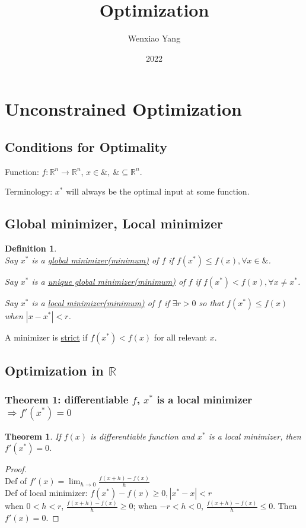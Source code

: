 \documentclass[11pt,a4paper]{article}
\title{Optimization}
\author[*]{Wenxiao Yang}
\affil[*]{Department of Mathematics, University of Illinois at Urbana-Champaign}
\date{2022}
\newtheorem{theorem}{Theorem}
\newtheorem{definition}{Definition}
\begin{document}
\maketitle
\tableofcontents
\newpage

\section{Unconstrained Optimization}
\subsection{Conditions for Optimality}
Function: $f:\mathbb{R}^n \rightarrow	\mathbb{R}^n$, $x\in \&,\ \&\subseteq \mathbb{R}^n$.

Terminology: $x^*$ will always be the optimal input at some function.

\subsection{Global minimizer, Local minimizer}
\begin{definition}
    \quad\\
    Say $x^*$ is a \underline{global minimizer(minimum)} of $f$ if $f(x^*)\leq f(x), \forall x\in \&$.

    Say $x^*$ is a \underline{unique global minimizer(minimum)} of $f$ if $f(x^*)< f(x), \forall x\neq x^*$.

    Say $x^*$ is a \underline{local minimizer(minimum)} of $f$ if $\exists r>0$ so that $f(x^*)\leq f(x)$ when $|x-x^*|<r$.
\end{definition}

A minimizer is \underline{strict} if $f(x^*)< f(x)$ for all relevant $x$.

\subsection{Optimization in $\mathbb{R}$}
\subsubsection{Theorem 1: differentiable $f$, $x^*$ is a local minimizer $\Rightarrow f'(x^*)=0$}

\begin{theorem}
If $f(x)$ is differentiable function and $x^*$ is a local minimizer, then $f'(x^*)=0$.
\end{theorem}

\begin{proof}
\quad\\
Def of $f'(x)=\lim_{h \rightarrow 0} \frac{f(x+h)-f(x)}{h}$\\
Def of local minimizer: $f(x^*)-f(x)\geq 0, |x^*-x|<r$\\
when $0<h<r$, $\frac{f(x+h)-f(x)}{h}\geq 0$; when $-r<h<0$, $\frac{f(x+h)-f(x)}{h}\leq 0$. Then $f'(x)=0$.
\end{proof}
\end{document}
